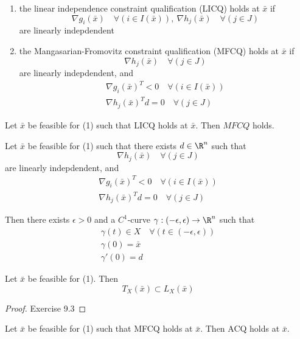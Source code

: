 \begin{enumerate}[label=(\alph*)]
	\item the linear independence constraint qualification (LICQ) holds
	      at $\bar x$ if
	      $$
		      \nabla g_i(\bar x)\quad\forall(i\in I(\bar x)),\ \nabla h_j(\bar x)\quad\forall(j\in J)
	      $$
	      are linearly indepdendent
	\item the Mangasarian-Fromovitz constraint qualification (MFCQ)
	      holds at $\bar x$ if
	      $$
		      \nabla h_j(\bar x)\quad\forall(j\in J)
	      $$
	      are linearly indepdendent, and
	      \begin{gather*}
		      \nabla g_i(\bar x)^T < 0  \quad\forall(i\in I(\bar x))\\
		      \nabla h_j(\bar x)^Td = 0 \quad\forall(j\in J)
	      \end{gather*}
\end{enumerate}

\label{a7ef3f5}

Let $\bar x$ be feasible for (1) such that LICQ holds at $\bar x$.
Then $MFCQ$ holds.

\label{a9bea04}

Let $\bar x$ be feasible for (1) such that there exists $d\in\R^n$
such that
$$
	\nabla h_j(\bar x)\quad\forall(j\in J)
$$
are linearly indepdendent, and
\begin{gather*}
	\nabla g_i(\bar x)^T < 0  \quad\forall(i\in I(\bar x))\\
	\nabla h_j(\bar x)^Td = 0 \quad\forall(j\in J)
\end{gather*}

Then there exists $\epsilon>0$ and a $C^1$-curve
$\gamma:(-\epsilon,\epsilon)\to\R^n$ such that
\begin{gather*}
	\gamma(t) \in X\quad\forall(t\in(-\epsilon,\epsilon)) \\
	\gamma(0) = \bar x \\
	\gamma'(0)=d
\end{gather*}


\label{a08cd35}

Let $\bar x$ be feasible for (1). Then
$$
	T_X(\bar x)\subset L_X(\bar x)
$$

\begin{proof}
	Exercise 9.3
\end{proof}

\label{eddce03}

Let $\bar x$ be feasible for (1) such that MFCQ holds at $\bar x$.
Then ACQ holds at $\bar x$.

